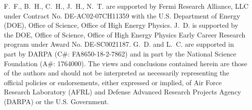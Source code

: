 \documentclass[sigconf]{acmart}
\newcommand{\noind}[0]{\vspace{5 pt} \noindent}
\newcommand{\noindpar}[1]{\noind {\bf #1}}
\begin{document}



\begin{acks}
F.~F., B.~H., C.~H., J.~H., N.~T. are supported by Fermi Research Alliance, LLC under Contract No. DE-AC02-07CH11359 with the U.S. Department of Energy (DOE), Office of Science, Office of High Energy Physics.
J.~D. is supported by the DOE, Office of Science, Office of High Energy Physics Early Career Research program under Award No. DE-SC0021187.
G.~D. and L.~C. are supported in part by DARPA (C\#: FA8650-18-2-7862) and in part by the National Science Foundation (A\#: 1764000). 
The views and conclusions contained herein are those of the authors and should not be interpreted as necessarily representing the official policies or endorsements, either expressed or implied, of Air Force Research Laboratory (AFRL) and Defense Advanced Research Projects Agency (DARPA) or the U.S. Government.
\end{acks}



\end{document}

